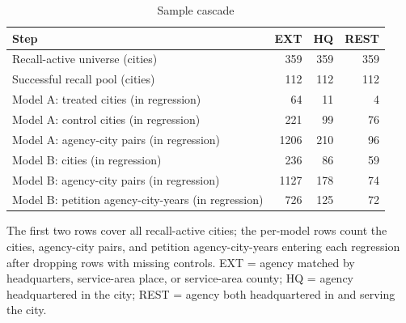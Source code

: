 \begin{table}

\caption{\label{tab:tab-cascade}Sample cascade}
\centering
\begin{threeparttable}
\begin{tabular}[t]{lrrr}
\toprule
Step & EXT & HQ & REST\\
\midrule
Recall-active universe (cities) & 359 & 359 & 359\\
Successful recall pool (cities) & 112 & 112 & 112\\
Model A: treated cities (in regression) & 64 & 11 & 4\\
Model A: control cities (in regression) & 221 & 99 & 76\\
Model A: agency-city pairs (in regression) & 1206 & 210 & 96\\
\addlinespace
Model B: cities (in regression) & 236 & 86 & 59\\
Model B: agency-city pairs (in regression) & 1127 & 178 & 74\\
Model B: petition agency-city-years (in regression) & 726 & 125 & 72\\
\bottomrule
\end{tabular}
\begin{tablenotes}[para]
\item The first two rows cover all recall-active cities; the per-model rows count the cities, agency-city pairs, and petition agency-city-years entering each regression after dropping rows with missing controls. EXT = agency matched by headquarters, service-area place, or service-area county; HQ = agency headquartered in the city; REST = agency both headquartered in and serving the city.
\end{tablenotes}
\end{threeparttable}
\end{table}
